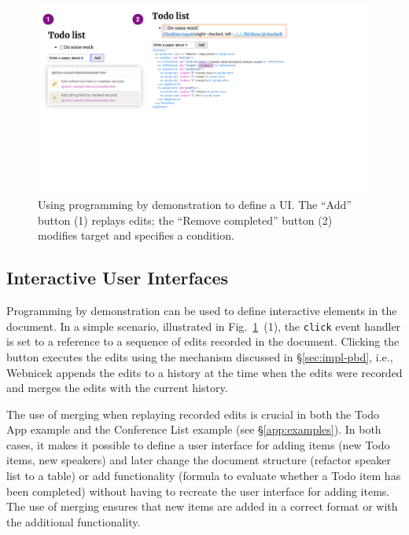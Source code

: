 \documentclass[sigconf,anonymous,screen]{acmart}
\begin{document}
\begin{figure}[t]
\vspace{-0.5em}
\includegraphics[width=1\columnwidth,clip,trim=0.5cm 8.5cm 8.5cm 0.5cm]{fig/interactive.pdf}
\vspace{-1.25em}
\caption{Using programming by demonstration to define a UI. The ``Add'' button (1) replays edits;
the ``Remove completed'' button (2) modifies target and specifies a condition. }
\label{fig:interactive}
\vspace{-2em}
\end{figure}


\subsection{Interactive User Interfaces}
\label{sec:impl-interaction}

Programming by demonstration can be used to define interactive elements in the document. In a
simple scenario, illustrated in Fig.~\ref{fig:interactive}~(1), the {\small\Verb_click_} event
handler is set to a reference to a sequence of edits recorded in the document. Clicking the button
executes the edits using the mechanism discussed in \S\ref{sec:impl-pbd}, i.e., Webnicek appends
the edits to a history at the time when the edits were recorded and merges the edits with the
current history.

The use of merging when replaying recorded edits is crucial in both the Todo App example and the
Conference List example (see \S\ref{app:examples}). In both cases, it makes it possible to define
a user interface for adding items (new Todo items, new speakers) and later change the document
structure (refactor speaker list to a table) or add functionality (formula to evaluate whether a
Todo item has been completed) without having to recreate the user interface for adding items.
The use of merging ensures that new items are added in a correct format or with the additional
functionality.
\end{document}
